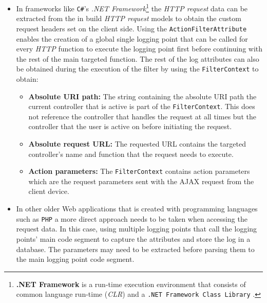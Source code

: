 \begin{itemize}
	\item In frameworks like \texttt{C\#}'s \emph{.NET Framework}\footnote{\label{ftn:ch2_NetFramework}\textbf{.NET Framework} is a run-time execution environment that consists of common language run-time (\emph{CLR}) and a \texttt{.NET Framework Class Library} \cite{Harkness2007}.} the \textit{HTTP request} data can be extracted from the in build \textit{HTTP request} models to obtain the custom request headers set on the client side. Using the \texttt{ActionFilterAttribute} enables the creation of a global single logging point that can be called for every \textit{HTTP} function to execute the logging point first before continuing with the rest of the main targeted function. The rest of the log attributes can also be obtained during the execution of the filter by using the \texttt{FilterContext} to obtain:
	\begin{itemize}
		\item \textbf{Absolute URI path:} The string containing the absolute URI path the current controller that is active is part of the \texttt{FilterContext}. This does not reference the controller that handles the request at all times but the controller that the user is active on before initiating the request.
		\item \textbf{Absolute request URL:} The requested URL contains the targeted controller's name and function that the request needs to execute. 
		\item \textbf{Action parameters:} The \texttt{FilterContext} contains action parameters which are the request parameters sent with the AJAX request from the client device.
	\end{itemize}
	\item In other older Web applications that is created with programming languages such as \texttt{PHP} a more direct approach needs to be taken when accessing the request data. In this case, using multiple logging points that call the logging points' main code segment to capture the attributes and store the log in a database. The parameters may need to be extracted before parsing them to the main logging point code segment.
\end{itemize}

